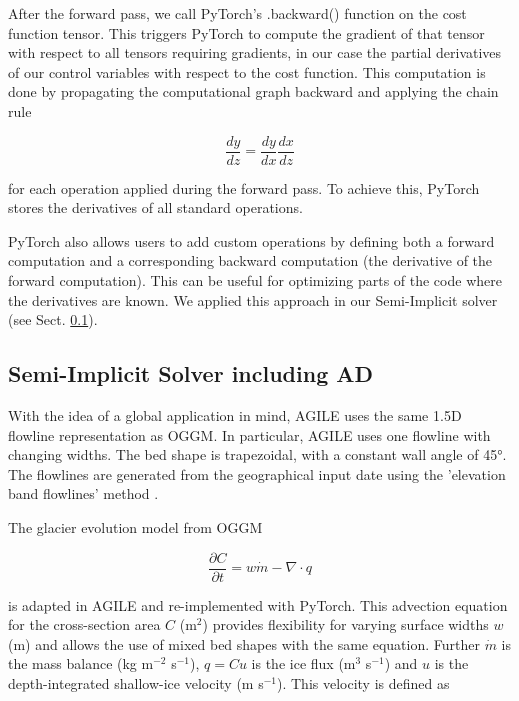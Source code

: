 \documentclass[journal abbreviation, manuscript]{copernicus}
\begin{document}
After the forward pass, we call PyTorch's .backward() function on the cost function tensor. This triggers PyTorch to compute the gradient of that tensor with respect to all tensors requiring gradients, in our case the partial derivatives of our control variables with respect to the cost function. This computation is done by propagating the computational graph backward and applying the chain rule

\begin{equation}
    \frac{dy}{dz} = \frac{dy}{dx}\frac{dx}{dz}
\end{equation}

\noindent for each operation applied during the forward pass. To achieve this, PyTorch stores the derivatives of all standard operations.

PyTorch also allows users to add custom operations by defining both a forward computation and a corresponding backward computation (the derivative of the forward computation). This can be useful for optimizing parts of the code where the derivatives are known. We applied this approach in our Semi-Implicit solver (see Sect. \ref{appendix:semi_impicit}).

\subsection{Semi-Implicit Solver including AD}     %
\label{appendix:semi_impicit}

With the idea of a global application in mind, AGILE uses the same 1.5D flowline representation as OGGM. In particular, AGILE uses one flowline with changing widths. The bed shape is trapezoidal, with a constant wall angle of 45°. The flowlines are generated from the geographical input date using the 'elevation band flowlines' method \citep[e.g.][]{Huss2012, Huss2015, Werder2019}.

The glacier evolution model from OGGM \citep[originally introduced by][]{Oerlemans1997} 

\begin{equation}
\label{eqn:advection_cross_section}
    \frac{\partial C}{\partial t} = w \Dot{m} - \nabla \cdot q
\end{equation}

\noindent is adapted in AGILE and re-implemented with PyTorch. This advection equation for the cross-section area $C$ (m$^2$) provides flexibility for varying surface widths $w$ (m) and allows the use of mixed bed shapes with the same equation. Further $\Dot{m}$ is the mass balance (kg m$^{-2}$ s$^{-1}$), $q = C u$ is the ice flux (m$^3$ s$^{-1}$) and $u$ is the depth-integrated shallow-ice velocity (m s$^{-1}$). This velocity is defined as
\end{document}
